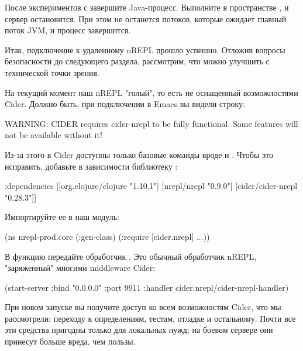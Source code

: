 После экспериментов с  завершите Java-процесс. Выполните  в пространстве , и сервер остановится. При этом не останется потоков, которые ожидает главный поток JVM, и процесс завершится.

Итак, подключение к удаленному nREPL прошло успешно. Отложив вопросы безопасности до следующего раздела, рассмотрим, что можно улучшить с технической точки зрения.

На текущий момент наш nREPL "голый", то есть не оснащенный возможностями Cider. Должно быть, при подключении в Emacs вы видели строку:

\begin{english}
  \begin{text}
WARNING: CIDER requires cider-nrepl to be fully functional.
Some features will not be available without it!
  \end{text}
\end{english}

Из-за этого в Cider доступны только базовые команды вроде  и . Чтобы это исправить, добавьте в зависимости библиотеку :

\begin{english}
  \begin{clojure}
  :dependencies
  [[org.clojure/clojure "1.10.1"]
   [nrepl/nrepl "0.9.0"]
   [cider/cider-nrepl "0.28.3"]]
  \end{clojure}
\end{english}

Импортируйте ее в наш модуль:

\begin{english}
  \begin{clojure}
(ns nrepl-prod.core
  (:gen-class)
  (:require [cider.nrepl]
            ...))
  \end{clojure}
\end{english}

В функцию  передайте обработчик . Это обычный обработчик nREPL, "заряженный" многими middleware Cider:

\begin{english}
  \begin{clojure}
(start-server :bind "0.0.0.0" :port 9911
              :handler cider.nrepl/cider-nrepl-handler)
  \end{clojure}
\end{english}

При новом запуске вы получите доступ ко всем возможностям Cider, что мы рассмотрели: переходу к определениям, тестам, отладке и остальному. Почти все эти средства пригодны только для локальных нужд; на боевом сервере они принесут больше вреда, чем пользы.

